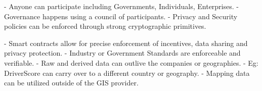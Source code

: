 - Anyone can participate including Governments, Individuals, Enterprises.
- Governance happens using a council of participants.
- Privacy and Security policies can be enforced through strong cryptographic primitives.


- Smart contracts allow for precise enforcement of incentives, data sharing and privacy protection.
- Industry or Government Standards are enforceable and verifiable.
- Raw and derived data can outlive the companies or geographies.
- Eg: DriverScore can carry over to a different country or geography.
- Mapping data can be utilized outside of the GIS provider.


